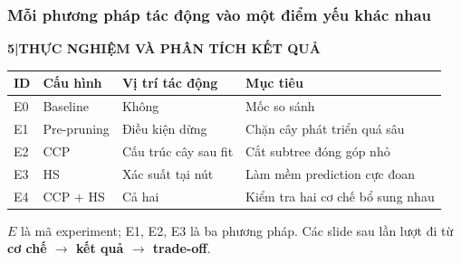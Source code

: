\documentclass[aspectratio=169,12pt]{beamer}
\renewcommand{\arraystretch}{1.18}
\newcommand{\chaptertag}[2]{%
  \vspace{-0.16cm}%
  {\scriptsize\bfseries\textcolor{boxframe}{#1\enspace |\enspace #2}}\par
  \vspace{0.12cm}%
}
\begin{document}
\begin{frame}
  \frametitle{Mỗi phương pháp tác động vào một điểm yếu khác nhau}
  \chaptertag{5}{THỰC NGHIỆM VÀ PHÂN TÍCH KẾT QUẢ}
  \footnotesize
  {\renewcommand{\arraystretch}{1.03}%
  \begin{tabularx}{\textwidth}{@{}C{0.8cm}L{2.5cm}L{3.0cm}Y@{}}
    \toprule
    \textbf{ID} & \textbf{Cấu hình} & \textbf{Vị trí tác động} & \textbf{Mục tiêu} \\
    \midrule
    E0 & Baseline & Không & Mốc so sánh \\
    E1 & Pre-pruning & Điều kiện dừng & Chặn cây phát triển quá sâu \\
    E2 & CCP & Cấu trúc cây sau fit & Cắt subtree đóng góp nhỏ \\
    E3 & HS & Xác suất tại nút & Làm mềm prediction cực đoan \\
    E4 & CCP + HS & Cả hai & Kiểm tra hai cơ chế bổ sung nhau \\
    \bottomrule
  \end{tabularx}}
  \par\vspace{0.24cm}
  \centering
  $E$ là mã experiment; E1, E2, E3 là ba phương pháp. Các slide sau lần lượt đi từ \textbf{cơ chế $\rightarrow$ kết quả $\rightarrow$ trade-off}.
\end{frame}
\end{document}
